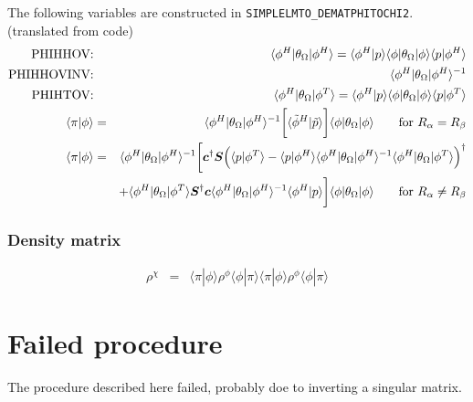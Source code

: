 \documentclass[11pt,a4paper]{report}
\begin{document}
The following variables are constructed in \verb|SIMPLELMTO_DEMATPHITOCHI2|.
(translated from code)
\begin{eqnarray}
\text{PHIHHOV:} && 
\langle\phi^H|\theta_\Omega|\phi^H\rangle
=\langle\phi^H|p\rangle
\langle\phi|\theta_\Omega|\phi\rangle
\langle{p}|\phi^H\rangle
\nonumber\\
%
\text{PHIHHOVINV:} && \langle\phi^H|\theta_\Omega|\phi^H\rangle^{-1}
\nonumber\\
%
\text{PHIHTOV:} && \langle\phi^H|\theta_\Omega|\phi^T\rangle
=\langle\phi^H|p\rangle
\langle\phi|\theta_\Omega|\phi\rangle
\langle{p}|\phi^T\rangle
\nonumber\\
%
\langle\pi|\phi\rangle&=&
\langle\phi^H|\theta_\Omega|\phi^H\rangle^{-1}
\biggl[
\langle\tilde{\phi}^H|\tilde{p}\rangle
\biggr] \langle\phi|\theta_\Omega|\phi\rangle
\qquad\text{for $R_\alpha=R_\beta$}
\nonumber\\
%
%
\langle\pi|\phi\rangle&=&
\langle\phi^H|\theta_\Omega|\phi^H\rangle^{-1}
\biggl[
\mat{c}^\dagger\mat{S}
\Bigl(
\langle{p}|\phi^T\rangle
-\langle{p}|\phi^H\rangle
\langle\phi^H|\theta_\Omega|\phi^H\rangle^{-1}
\langle\phi^H|\theta_\Omega|\phi^T\rangle\Bigr)^\dagger
\nonumber\\
&&+
\langle\phi^H|\theta_\Omega|\phi^T\rangle\mat{S}^\dagger\mat{c}
\langle\phi^H|\theta_\Omega|\phi^H\rangle^{-1}
\langle\phi^H|{p}\rangle
\biggr] \langle\phi|\theta_\Omega|\phi\rangle
\qquad\text{for $R_\alpha\neq R_\beta$}
\end{eqnarray}


\subsubsection{Density matrix}

\begin{eqnarray}
\rho^\chi&=&\langle\pi|\phi\rangle\rho^\phi\langle\phi|\pi\rangle
\nonumber
\langle\pi|\phi\rangle\rho^\phi\langle\phi|\pi\rangle
\end{eqnarray}



\section{Failed procedure}
The procedure described here failed, probably doe to inverting a
singular matrix.
\end{document}
